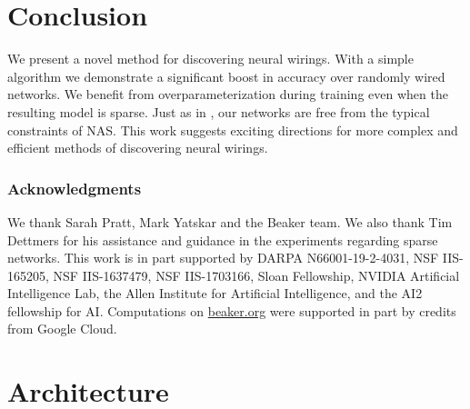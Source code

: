 \documentclass{article}
\begin{document}
\section{Conclusion} \label{sec:conclusion}

We present a novel method for discovering neural wirings. With a simple algorithm we demonstrate a significant boost in accuracy over randomly wired networks. We benefit from overparameterization during training even when the resulting model is sparse. Just as in \cite{randwire}, our networks are free from the typical constraints of NAS. This work suggests exciting directions for more complex and efficient methods of discovering neural wirings.

\subsubsection*{Acknowledgments}
We thank Sarah Pratt, Mark Yatskar and the Beaker team. We also thank Tim Dettmers for his assistance and guidance in the experiments regarding sparse networks. This work is in part supported by DARPA N66001-19-2-4031, NSF IIS-165205,  NSF IIS-1637479, NSF IIS-1703166, Sloan Fellowship, NVIDIA Artificial Intelligence Lab, the Allen Institute for Artificial Intelligence, and the AI2 fellowship for AI. Computations on \url{beaker.org} were supported in part by credits from Google Cloud. 

\medskip

{\small


}


\newpage
\appendix

\section{Architecture}
\end{document}
